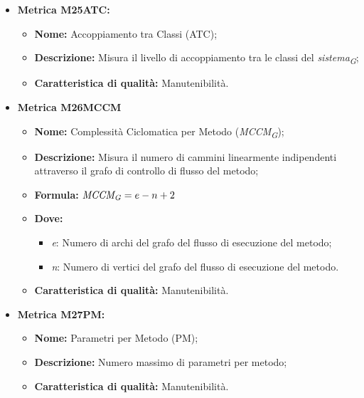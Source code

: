 \begin{itemize}
            \item \hypertarget{item:M25ATC}{\textbf{Metrica M25ATC:}}
            \begin{minipage}[t]{0.9\textwidth}
                  \begin{itemize}
                      \item \textbf{Nome:} Accoppiamento tra Classi (ATC);
                      \item \textbf{Descrizione:} Misura il livello di accoppiamento tra le classi del \textit{sistema}\textsubscript{\textit{G}};
                      \item \textbf{Caratteristica di qualità:} Manutenibilità.
                  \end{itemize}
                \end{minipage}

        \item \hypertarget{item:M26MCCM}{\textbf{Metrica M26MCCM}}
        \begin{minipage}[t]{0.9\textwidth}
            \begin{itemize}
            \item \textbf{Nome:} Complessità Ciclomatica per Metodo (\textit{MCCM}\textsubscript{\textit{G}});
            \item \textbf{Descrizione:} Misura il numero di cammini linearmente indipendenti attraverso il grafo di controllo di flusso del metodo;
            \item \textbf{Formula:} $\textit{MCCM}\textsubscript{\textit{G}} = e - n + 2$
            \item \textbf{Dove:}
            \begin{itemize}
                        \item \textit{e}: Numero di archi del grafo del flusso di esecuzione del metodo;
                        \item \textit{n}: Numero di vertici del grafo del flusso di esecuzione del metodo.
            \end{itemize}
            \item \textbf{Caratteristica di qualità:} Manutenibilità.
         \end{itemize}
        \end{minipage}

        \item \hypertarget{item:M27PM}{\textbf{Metrica M27PM:}}
        \begin{minipage}[t]{0.9\textwidth}
        \begin{itemize}
            \item \textbf{Nome:} Parametri per Metodo (PM);
            \item \textbf{Descrizione:} Numero massimo di parametri per metodo;
            \item \textbf{Caratteristica di qualità:} Manutenibilità.
          \end{itemize}
        \end{minipage}


\end{itemize}
